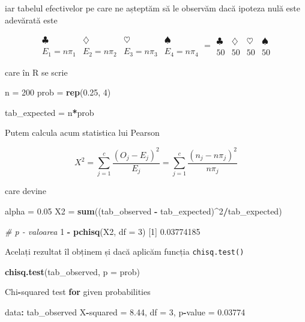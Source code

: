 \documentclass[]{article}
\newenvironment{Shaded}{\begin{snugshade}}{\end{snugshade}}
\newcommand{\CommentTok}[1]{\textcolor[rgb]{0.56,0.35,0.01}{\textit{#1}}}
\newcommand{\ControlFlowTok}[1]{\textcolor[rgb]{0.13,0.29,0.53}{\textbf{#1}}}
\newcommand{\DataTypeTok}[1]{\textcolor[rgb]{0.13,0.29,0.53}{#1}}
\newcommand{\DecValTok}[1]{\textcolor[rgb]{0.00,0.00,0.81}{#1}}
\newcommand{\FloatTok}[1]{\textcolor[rgb]{0.00,0.00,0.81}{#1}}
\newcommand{\KeywordTok}[1]{\textcolor[rgb]{0.13,0.29,0.53}{\textbf{#1}}}
\newcommand{\NormalTok}[1]{#1}
\newcommand{\OperatorTok}[1]{\textcolor[rgb]{0.81,0.36,0.00}{\textbf{#1}}}
\newcommand{\StringTok}[1]{\textcolor[rgb]{0.31,0.60,0.02}{#1}}
\begin{document}
iar tabelul efectivelor pe care ne așteptăm să le observăm dacă ipoteza
nulă este adevărată este

\[
\begin{array}{c|c|c|c}
  \clubsuit & \diamondsuit & \heartsuit & \spadesuit \\
  \hline
  E_1 = n\pi_1 & E_2 = n\pi_2 & E_3 = n\pi_3 & E_4 = n\pi_4
\end{array} 
=
\begin{array}{c|c|c|c}
  \clubsuit & \diamondsuit & \heartsuit & \spadesuit \\
  \hline
  50 & 50 & 50 & 50
\end{array}
\]

care în R se scrie

\begin{Shaded}
\begin{Highlighting}[]
\NormalTok{n =}\StringTok{ }\DecValTok{200}
\NormalTok{prob =}\StringTok{ }\KeywordTok{rep}\NormalTok{(}\FloatTok{0.25}\NormalTok{, }\DecValTok{4}\NormalTok{)}

\NormalTok{tab_expected =}\StringTok{ }\NormalTok{n}\OperatorTok{*}\NormalTok{prob}
\end{Highlighting}
\end{Shaded}

Putem calcula acum statistica lui Pearson

\[
  X^2 = \sum_{j = 1}^{c}\frac{(O_{j} - E_{j})^2}{E_{j}} = \sum_{j = 1}^{c}\frac{\left(n_{j} - n \pi_j\right)^2}{n \pi_j}
\]

care devine

\begin{Shaded}
\begin{Highlighting}[]
\NormalTok{alpha =}\StringTok{ }\FloatTok{0.05}
\NormalTok{X2 =}\StringTok{ }\KeywordTok{sum}\NormalTok{((tab_observed }\OperatorTok{-}\StringTok{ }\NormalTok{tab_expected)}\OperatorTok{^}\DecValTok{2}\OperatorTok{/}\NormalTok{tab_expected)}

\CommentTok{# p - valoarea}
\DecValTok{1} \OperatorTok{-}\StringTok{ }\KeywordTok{pchisq}\NormalTok{(X2, }\DataTypeTok{df =} \DecValTok{3}\NormalTok{)}
\NormalTok{[}\DecValTok{1}\NormalTok{] }\FloatTok{0.03774185}
\end{Highlighting}
\end{Shaded}

Acelați rezultat îl obținem și dacă aplicăm funcția
\texttt{chisq.test()}

\begin{Shaded}
\begin{Highlighting}[]
\KeywordTok{chisq.test}\NormalTok{(tab_observed, }\DataTypeTok{p =}\NormalTok{ prob)}

\NormalTok{    Chi}\OperatorTok{-}\NormalTok{squared test }\ControlFlowTok{for}\NormalTok{ given probabilities}

\NormalTok{data}\OperatorTok{:}\StringTok{  }\NormalTok{tab_observed}
\NormalTok{X}\OperatorTok{-}\NormalTok{squared =}\StringTok{ }\FloatTok{8.44}\NormalTok{, df =}\StringTok{ }\DecValTok{3}\NormalTok{, p}\OperatorTok{-}\NormalTok{value =}\StringTok{ }\FloatTok{0.03774}
\end{Highlighting}
\end{Shaded}
\end{document}
